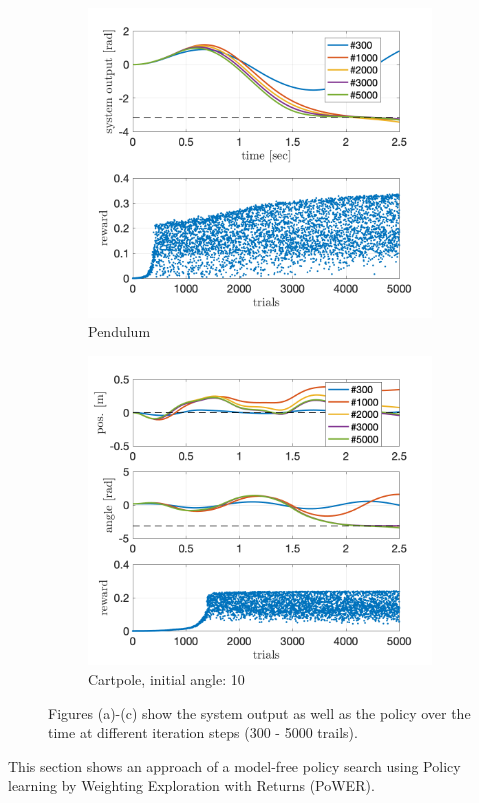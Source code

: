 \documentclass[letterpaper, 10 pt, conference]{ieeeconf}  %
\begin{document}
\begin{figure}[!thp]
\begin{subfigure}{0.325\textwidth}
	\includegraphics[width=\textwidth]{julia_pend_quad_with_2000trails.png}
	\caption{Pendulum \newline}\label{fig:PoWER_pendulum}
	\end{subfigure}
	\begin{subfigure}{0.325\textwidth}
	\includegraphics[width=\textwidth]{julia_cp10_quad_with_2000trails.png}
	\caption{Cartpole, initial angle: 10\textdegree}\label{fig:PoWER_cp}
	\end{subfigure}\caption{Figures (a)-(c) show the system output as well as the policy over the time at different iteration steps (300 - 5000 trails).}\label{fig:PoWER}
\end{figure} 
This section shows an approach of a model-free policy search using Policy learning by Weighting Exploration with Returns (PoWER).
\end{document}
